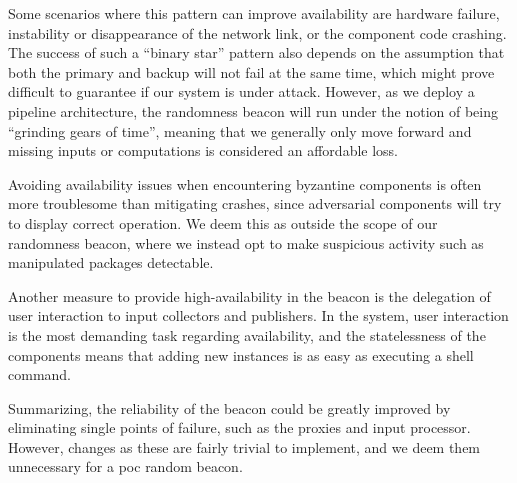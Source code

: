 Some scenarios where this pattern can improve availability are hardware failure, instability or disappearance of the network link, or the component code crashing.
The success of such a \enquote{binary star} pattern also depends on the assumption that both the primary and backup will not fail at the same time, which might prove difficult to guarantee if our system is under attack.
However, as we deploy a pipeline architecture, the randomness beacon will run under the notion of being \enquote{grinding gears of time}, meaning that we generally only move forward and missing inputs or computations is considered an affordable loss.

Avoiding availability issues when encountering byzantine components is often more troublesome than mitigating crashes, since adversarial components will try to display correct operation.
We deem this as outside the scope of our randomness beacon, where we instead opt to make suspicious activity such as manipulated packages detectable.

Another measure to provide high-availability in the beacon is the delegation of user interaction to input collectors and publishers.
In the system, user interaction is the most demanding task regarding availability, and the statelessness of the components means that adding new instances is as easy as executing a shell command.

Summarizing, the reliability of the beacon could be greatly improved by eliminating single points of failure, such as the proxies and input processor.
However, changes as these are fairly trivial to implement, and we deem them unnecessary for a \gls{poc} random beacon.

